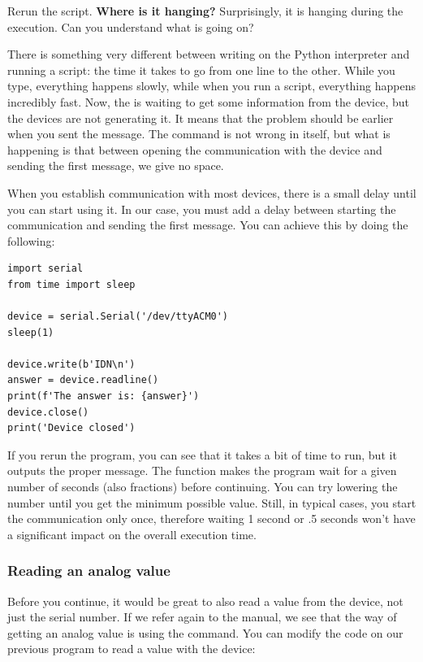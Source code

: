 Rerun the script. \textbf{Where is it hanging?} Surprisingly, it is hanging during the  execution. Can you understand what is going on?

There is something very different between writing on the Python interpreter and running a script: the time it takes to go from one line to the other. While you type, everything happens slowly, while when you run a script, everything happens incredibly fast. Now, the  is waiting to get some information from the device, but the devices are not generating it. It means that the problem should be earlier when you sent the  message. The command is not wrong in itself, but what is happening is that between opening the communication with the device and sending the first message, we give no space.

When you establish communication with most devices, there is a small delay until you can start using it. In our case, you must add a delay between starting the communication and sending the first message. You can achieve this by doing the following:

\begin{verbatim}
import serial
from time import sleep

device = serial.Serial('/dev/ttyACM0')
sleep(1)

device.write(b'IDN\n')
answer = device.readline()
print(f'The answer is: {answer}')
device.close()
print('Device closed')
\end{verbatim}

If you rerun the program, you can see that it takes a bit of time to run, but it outputs the proper message. The  function makes the program wait for a given number of seconds (also fractions) before continuing. You can try lowering the number until you get the minimum possible value. Still, in typical cases, you start the communication only once, therefore waiting 1 second or .5 seconds won't have a significant impact on the overall execution time.

\subsubsection{Reading an analog value}
Before you continue, it would be great to also read a value from the device, not just the serial number. If we refer again to the manual, we see that the way of getting an analog value is using the  command. You can modify the code on our previous program to read a value with the device:

